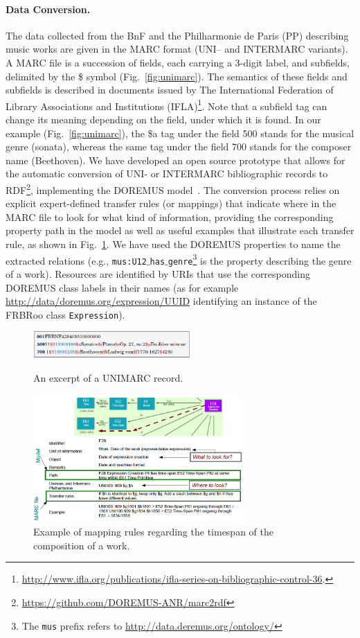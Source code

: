 \documentclass[runningheads,a4paper]{llncs}
\begin{document}
\paragraph{{\bf Data Conversion.}} The data collected from the BnF and the Philharmonie de Paris (PP) describing music works are given in the MARC format (UNI-- and INTERMARC variants). A MARC file is a succession of fields, each carrying a 3-digit label, and subfields, delimited by the \$ symbol (Fig.~\ref{fig:unimarc}). The semantics of these fields and subfields is described in documents issued by The International Federation of Library Associations and Institutions (IFLA)\footnote{\url{http://www.ifla.org/publications/ifla-series-on-bibliographic-control-36}.}. Note that a subfield tag can change its meaning depending on the field, under which it is found. In our example (Fig.~\ref{fig:unimarc}), the \$a tag under the field 500 stands for the musical genre (sonata), whereas the same tag under the field 700 stands for the composer name (Beethoven). We have developed an open source prototype that allows for the automatic conversion of UNI- or INTERMARC bibliographic records to RDF\footnote{\url{https://github.com/DOREMUS-ANR/marc2rdf}}, implementing the DOREMUS model~\cite{choffe2016doremus}. The conversion process relies on explicit expert-defined transfer rules (or mappings) that indicate where in the MARC file to look for what kind of information, providing the corresponding property path in the model as well as useful examples that illustrate each transfer rule, as shown in Fig.~\ref{fig:mappings}. We have used the DOREMUS properties to name the extracted relations (e.g., \texttt{mus:U12$\_$has$\_$genre}\footnote{The \texttt{mus} prefix refers to \url{http://data.deremus.org/ontology/}} is the property describing the genre of a work). Resources are identified by URIs that use the corresponding DOREMUS class labels in their names (as for example \url{http://data/doremus.org/expression/UUID} identifying an instance of the FRBRoo class \texttt{Expression}).
\begin{figure}
  \centering
  \includegraphics[width=6cm]{img/marc-exmpl-simple.png}
  \caption{An excerpt of a UNIMARC record.}
  \label{fig:unimarc}
\smallskip
  \centering
  \includegraphics[width=8cm]{img/mapping-rules.png}
  \caption{Example of mapping rules regarding the timespan of the composition of a work.}
  \label{fig:mappings}
\end{figure}
\end{document}
